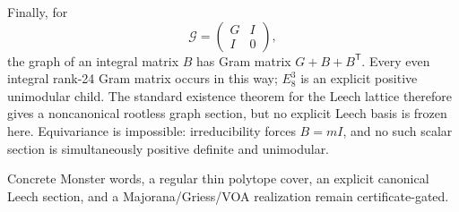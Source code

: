 Finally, for
\[
\mathcal G=\begin{pmatrix}G&I\\I&0\end{pmatrix},
\]
the graph of an integral matrix $B$ has Gram matrix $G+B+B^{\mathsf T}$.  Every even integral rank-24 Gram matrix occurs in this way; $E_8^3$ is an explicit positive unimodular child.  The standard existence theorem for the Leech lattice therefore gives a noncanonical rootless graph section, but no explicit Leech basis is frozen here.  Equivariance is impossible: irreducibility forces $B=mI$, and no such scalar section is simultaneously positive definite and unimodular.

Concrete Monster words, a regular thin polytope cover, an explicit canonical Leech section, and a Majorana/Griess/VOA realization remain certificate-gated.
